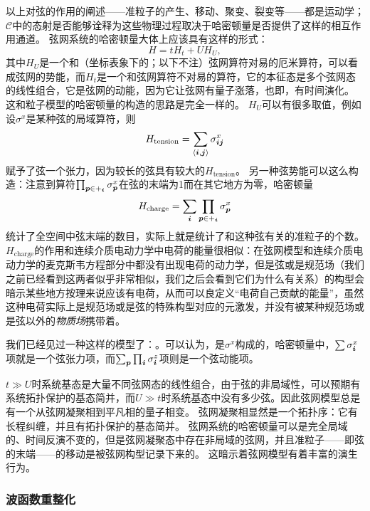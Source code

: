 以上对弦的作用的阐述——准粒子的产生、移动、聚变、裂变等——都是运动学；$\mathcal{C}$中的态射是否能够诠释为这些物理过程取决于哈密顿量是否提供了这样的相互作用通道。
弦网系统的哈密顿量大体上应该具有这样的形式：
\begin{equation}
    H = t H_t + U H_U,
\end{equation}
其中$H_U$是一个和（坐标表象下的；以下不注）弦网算符对易的厄米算符，可以看成弦网的势能，而$H_t$是一个和弦网算符不对易的算符，它的本征态是多个弦网态的线性组合，它是弦网的动能，因为它让弦网有量子涨落，也即，有时间演化。
这和粒子模型的哈密顿量的构造的思路是完全一样的。
$H_U$可以有很多取值，例如设$\sigma^x$是某种弦的局域算符，则
\begin{equation}
    H_\text{tension} = \sum_{\langle \vb*{i}, \vb*{j} \rangle} \sigma^x_{\vb*{i} \vb*{j}}
\end{equation}
赋予了弦一个张力，因为较长的弦具有较大的$H_\text{tension}$。
另一种弦势能可以这么构造：注意到算符$\prod_{\vb*{p} \in +_{\vb*{i}}} \sigma^x_{\vb*{p}}$在弦的末端为1而在其它地方为零，哈密顿量
\begin{equation}
    H_\text{charge} = \sum_{\vb*{i}} \prod_{\vb*{p} \in +_{\vb*{i}}} \sigma^x_{\vb*{p}}
\end{equation}
统计了全空间中弦末端的数目，实际上就是统计了和这种弦有关的准粒子的个数。
$H_\text{charge}$的作用和连续介质电动力学中电荷的能量很相似：在弦网模型和连续介质电动力学的麦克斯韦方程部分中都没有出现电荷的动力学，但是弦或是规范场（我们之前已经看到这两者似乎非常相似，我们之后会看到它们为什么有关系）的构型会暗示某些地方按理来说应该有电荷，从而可以良定义“电荷自己贡献的能量”，虽然这种电荷实际上是规范场或是弦的特殊构型对应的元激发，并没有被某种规范场或是弦以外的\emph{物质场}携带着。

我们已经见过一种这样的模型了：。可以认为，是$\sigma^x$构成的，哈密顿量中，$\sum \sigma^x_{\vb*{i}}$项就是一个弦张力项，而$\sum_{\vb*{p}} \prod_{\vb*{i}} \sigma^z_{\vb*{i}}$项则是一个弦动能项。

$t \gg U$时系统基态是大量不同弦网态的线性组合，由于弦的非局域性，可以预期有系统拓扑保护的基态简并，而$U \gg t$时系统基态中没有多少弦。因此弦网模型总是有一个从弦网凝聚相到平凡相的量子相变。
弦网凝聚相显然是一个拓扑序：它有长程纠缠，并且有拓扑保护的基态简并。
弦网系统的哈密顿量可以是完全局域的、时间反演不变的，但是弦网凝聚态中存在非局域的弦网，并且准粒子——即弦的末端——的移动是被弦网构型记录下来的。
这暗示着弦网模型有着丰富的演生行为。

\subsubsection{波函数重整化}

